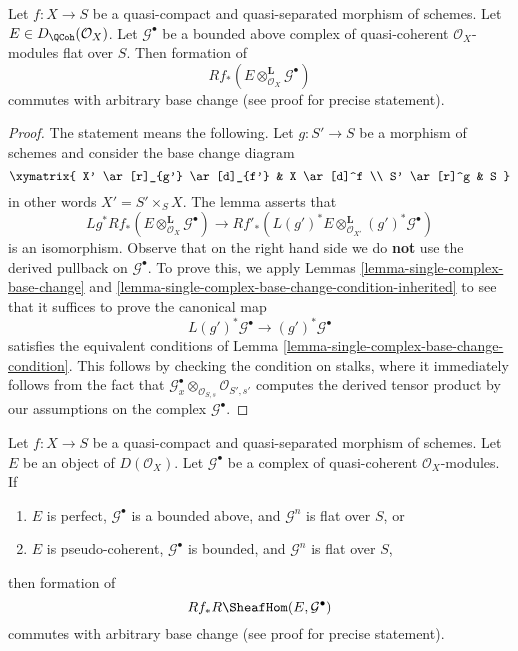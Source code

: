 \begin{lemma}
\label{lemma-base-change-tensor}
Let $f : X \to S$ be a quasi-compact and quasi-separated morphism of
schemes. Let $E \in D_\QCoh(\mathcal{O}_X)$. Let $\mathcal{G}^\bullet$
be a bounded above complex of quasi-coherent
$\mathcal{O}_X$-modules flat over $S$. Then formation of
$$
Rf_*(E \otimes^\mathbf{L}_{\mathcal{O}_X} \mathcal{G}^\bullet)
$$
commutes with arbitrary base change (see proof for precise statement).
\end{lemma}

\begin{proof}
The statement means the following. Let $g : S' \to S$ be a morphism of
schemes and consider the base change diagram
$$
\xymatrix{
X' \ar[r]_{g'} \ar[d]_{f'} &
X \ar[d]^f \\
S' \ar[r]^g &
S
}
$$
in other words $X' = S' \times_S X$. The lemma asserts that
$$
Lg^*Rf_*(E \otimes^\mathbf{L}_{\mathcal{O}_X} \mathcal{G}^\bullet)
\longrightarrow
Rf'_*\left(
L(g')^*E \otimes^\mathbf{L}_{\mathcal{O}_{X'}} (g')^*\mathcal{G}^\bullet
\right)
$$
is an isomorphism. Observe that on the right hand side we do {\bf not}
use the derived pullback on $\mathcal{G}^\bullet$.
To prove this, we apply Lemmas \ref{lemma-single-complex-base-change} and
\ref{lemma-single-complex-base-change-condition-inherited} to see that it
suffices to prove the canonical map
$$
L(g')^*\mathcal{G}^\bullet \to (g')^*\mathcal{G}^\bullet
$$
satisfies the equivalent conditions of
Lemma \ref{lemma-single-complex-base-change-condition}.
This follows by checking the condition on stalks, where it
immediately follows from the fact that
$\mathcal{G}^\bullet_x \otimes_{\mathcal{O}_{S, s}} \mathcal{O}_{S', s'}$
computes the derived tensor product by our assumptions on the complex
$\mathcal{G}^\bullet$.
\end{proof}

\begin{lemma}
\label{lemma-base-change-RHom}
Let $f : X \to S$ be a quasi-compact and quasi-separated morphism of schemes.
Let $E$ be an object of $D(\mathcal{O}_X)$.
Let $\mathcal{G}^\bullet$ be a complex of
quasi-coherent $\mathcal{O}_X$-modules. If
\begin{enumerate}
\item $E$ is perfect, $\mathcal{G}^\bullet$ is a bounded above,
and $\mathcal{G}^n$ is flat over $S$, or
\item $E$ is pseudo-coherent, $\mathcal{G}^\bullet$ is bounded,
and $\mathcal{G}^n$ is flat over $S$,
\end{enumerate}
then formation of
$$
Rf_*R\SheafHom(E, \mathcal{G}^\bullet)
$$
commutes with arbitrary base change (see proof for precise statement).
\end{lemma}

